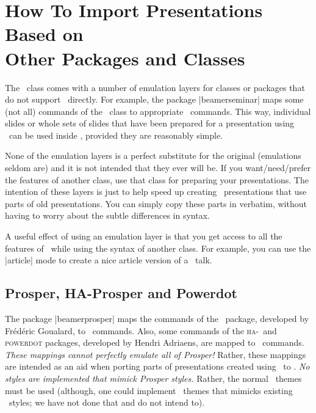 %
%
%


\section[How To Import Presentations Based on Other Packages and Classes]{How To Import Presentations Based on\\ Other Packages and Classes}

The \beamer\ class comes with a number of emulation layers for classes or packages that do not support \beamer\ directly. For example, the package |beamerseminar| maps some (not all) commands of the \seminar\ class to appropriate \beamer\ commands. This way, individual slides or whole sets of slides that have been prepared for a presentation using \seminar\ can be used inside \beamer, provided they are reasonably simple.

None of the emulation layers is a perfect substitute for the original (emulations seldom are) and it is not intended that they ever will be. If you want/need/prefer the features of another class, use that class for preparing your presentations. The intention of these layers is just to help speed up creating \beamer\ presentations that use parts of old presentations. You can simply copy these parts in verbatim, without having to worry about the subtle differences in syntax.

A useful effect of using an emulation layer is that you get access to all the features of \beamer\ while using the syntax of another class. For example, you can use the |article| mode to create a nice article version of a \prosper\ talk.


\subsection{Prosper, HA-Prosper and Powerdot}
\label{section-prosper}

The package |beamerprosper| maps the commands of the \prosper\ package, developed by Fr\'ed\'eric Goualard, to \beamer\ commands. Also, some commands of the \textsc{ha}-\prosper\ and \textsc{powerdot} packages, developed by Hendri Adriaens, are mapped to \beamer\ commands. \emph{These mappings cannot perfectly emulate all of Prosper!} Rather, these mappings are intended as an aid when porting parts of presentations created using \prosper\ to \beamer. \emph{No styles are implemented that mimick Prosper styles.} Rather, the normal \beamer\ themes must be used (although, one could implement \beamer\ themes that mimicks existing \prosper\ styles; we have not done that and do not intend to).

